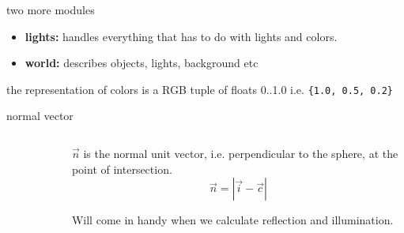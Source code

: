 \begin{frame}[fragile]{two more modules}

\begin{itemize}
\item {\bf lights:} handles everything that has to do with lights and colors.
\item {\bf world:} describes objects, lights, background etc
\end{itemize}

\pause 
\vspace{20pt} the representation of colors is a RGB tuple of floats 0..1.0 i.e. \verb+{1.0, 0.5, 0.2}+
\end{frame}



\begin{frame}[fragile]{normal vector}


\begin{columns}
 \begin{column}{0.4\linewidth}
\begin{figure}
\end{figure}
 \end{column}
\pause
 \begin{column}{0.6\linewidth}
$\vec{n}$ is the normal unit vector, i.e. perpendicular to the sphere, at the point of intersection.
  $$\vec{n} = |\vec{i} - \vec{c}|$$
\pause 

Will come in handy when we calculate reflection and illumination.

 \end{column}
\end{columns}

\end{frame}

